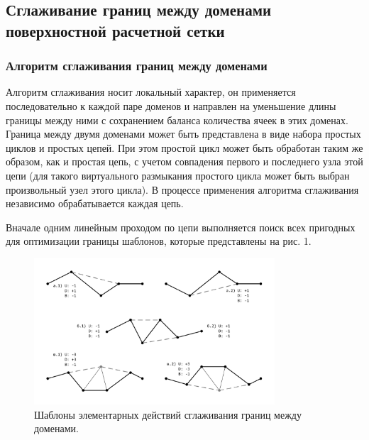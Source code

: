 \subsection{Сглаживание границ между доменами поверхностной расчетной сетки}

\subsubsection{Алгоритм сглаживания границ между доменами}

Алгоритм сглаживания носит локальный характер, он применяется последовательно к каждой паре доменов и направлен на уменьшение длины границы между ними с сохранением баланса количества ячеек в этих доменах.
Граница между двумя доменами может быть представлена в виде набора простых циклов и простых цепей.
При этом простой цикл может быть обработан таким же образом, как и простая цепь, с учетом совпадения первого и последнего узла этой цепи (для такого виртуального размыкания простого цикла может быть выбран произвольный узел этого цикла).
В процессе применения алгоритма сглаживания независимо обрабатывается каждая цепь.

Вначале одним линейным проходом по цепи выполняется поиск всех пригодных для оптимизации границы шаблонов, которые представлены на рис. 1.

\begin{figure}[ht]
	\centering
		\includegraphics[width=0.8\textwidth]{./pics/text_2_smooth/smooth-border.pdf}
	\caption{Шаблоны элементарных действий сглаживания границ между доменами.}
	\label{fig:text_2_smooth_smooth_border}
\end{figure}

